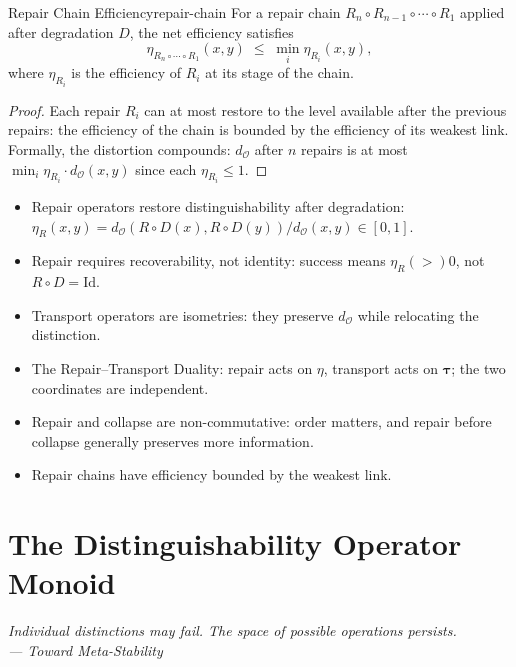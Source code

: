 \documentclass[12pt,twoside,openright]{book}
\newcommand{\repEff}{\eta}               %
\newcommand{\distMetric}{d_{\mathcal{O}}}
\newenvironment{epigraph}[2]{%
  \vspace{1em}\begin{flushright}
  \begin{minipage}{0.72\textwidth}
  \itshape\small #1\\[0.4em]
  \upshape\footnotesize\sffamily\color{DistGray}--- #2
  \end{minipage}\end{flushright}\vspace{1.5em}}{}
\newenvironment{chapsummary}{%
  \begin{tcolorbox}[colback=DistBlue!5,colframe=DistBlue,
    title={\faBookOpen\enspace Summary},
    fonttitle=\sffamily\bfseries\color{white},
    attach boxed title to top left={yshift=-2mm,xshift=4mm},
    boxed title style={colback=DistBlue,rounded corners}]
  \begin{itemize}[nosep,leftmargin=*]}{%
  \end{itemize}\end{tcolorbox}}
\providecommand{\repairEff}[1]{\eta_{R}(#1)}
\providecommand{\degradeOp}{D}
\begin{document}
\begin{proposition}{Repair Chain Efficiency}{repair-chain}
For a repair chain $R_n\circ R_{n-1}\circ\cdots\circ R_1$
applied after degradation $\degradeOp$, the net efficiency
satisfies
\[
  \eta_{R_n\circ\cdots\circ R_1}(x,y)
  \;\le\;
  \min_i \eta_{R_i}(x,y),
\]
where $\eta_{R_i}$ is the efficiency of $R_i$ at its stage
of the chain.
\begin{proof}
Each repair $R_i$ can at most restore to the level available
after the previous repairs: the efficiency of the chain is
bounded by the efficiency of its weakest link. Formally, the
distortion compounds: $\distMetric$ after $n$ repairs is at
most $\min_i \eta_{R_i}\cdot\distMetric(x,y)$ since each
$\eta_{R_i}\le 1$.
\end{proof}
\end{proposition}

\begin{chapsummary}
\item Repair operators restore distinguishability after
  degradation: $\repairEff{x,y}=\distMetric(R\circ D(x),
  R\circ D(y))/\distMetric(x,y)\in[0,1]$.
\item Repair requires recoverability, not identity: success
  means $\repairEff>0$, not $R\circ D=\mathrm{Id}$.
\item Transport operators are isometries: they preserve
  $\distMetric$ while relocating the distinction.
\item The Repair--Transport Duality: repair acts on $\repEff$,
  transport acts on $\boldsymbol{\tau}$; the two coordinates
  are independent.
\item Repair and collapse are non-commutative: order matters,
  and repair before collapse generally preserves more
  information.
\item Repair chains have efficiency bounded by the weakest
  link.
\end{chapsummary}


\chapter{The Distinguishability Operator Monoid}
\label{ch:operator-monoid}

\begin{epigraph}{Individual distinctions may fail. The space
  of possible operations persists.}{Toward Meta-Stability}
\end{epigraph}
\end{document}
